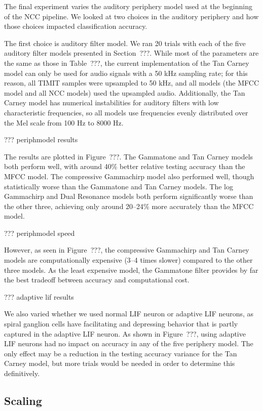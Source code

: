 The final experiment varies the auditory periphery model
used at the beginning of the NCC pipeline.
We looked at two choices in the auditory periphery
and how those choices impacted classification accuracy.

The first choice is auditory filter model.
We ran 20 trials with each of the five
auditory filter models presented in Section~???.
While most of the parameters are the same
as those in Table~???,
the current implementation of the Tan Carney model
can only be used for audio signals
with a 50 kHz sampling rate;
for this reason, all TIMIT samples
were upsampled to 50 kHz,
and all models (the MFCC model and all NCC models)
used the upsampled audio.
Additionally, the Tan Carney model
has numerical instabilities for auditory filters
with low characteristic frequencies,
so all models use frequencies
evenly distributed over the Mel scale
from 100 Hz to 8000 Hz.

??? periphmodel results

The results are plotted in Figure~???.
The Gammatone and Tan Carney models
both perform well,
with around 40\% better relative testing accuracy
than the MFCC model.
The compressive Gammachirp model
also performed well,
though statistically worse
than the Gammatone and Tan Carney models.
The log Gammachirp and Dual Resonance models
both perform significantly worse
than the other three,
achieving only around 20--24\%
more accurately than the MFCC model.

??? periphmodel speed

However, as seen in Figure~???,
the compressive Gammachirp
and Tan Carney models are
computationally expensive
(3--4 times slower)
compared to the other three models.
As the least expensive model,
the Gammatone filter
provides by far the best tradeoff
between accuracy and computational cost.

??? adaptive lif results

We also varied whether we used
normal LIF neuron or adaptive LIF neurons,
as spiral ganglion cells
have facilitating and depressing behavior
that is partly captured in the adaptive LIF neuron.
As shown in Figure~???,
using adaptive LIF neurons had no impact
on accuracy in any of the five periphery model.
The only effect may be a reduction
in the testing accuracy variance
for the Tan Carney model,
but more trials would be needed
in order to determine this definitively.

\subsection{Scaling}

